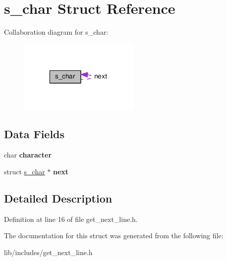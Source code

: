 \hypertarget{structs__char}{\section{s\-\_\-char Struct Reference}
\label{structs__char}
}


Collaboration diagram for s\-\_\-char\-:
\nopagebreak
\begin{figure}[H]
\begin{center}
\leavevmode
\includegraphics[width=166pt]{structs__char__coll__graph}
\end{center}
\end{figure}
\subsection*{Data Fields}
\begin{DoxyCompactItemize}
\item 
\hypertarget{structs__char_ac6027d2dbb9ac08b3b6729341c0bcf8f}{char {\bfseries character}}\label{structs__char_ac6027d2dbb9ac08b3b6729341c0bcf8f}

\item 
\hypertarget{structs__char_a948ac1df44de106ac471ed05df56482c}{struct \hyperlink{structs__char}{s\-\_\-char} $\ast$ {\bfseries next}}\label{structs__char_a948ac1df44de106ac471ed05df56482c}

\end{DoxyCompactItemize}


\subsection{Detailed Description}


Definition at line 16 of file get\-\_\-next\-\_\-line.\-h.



The documentation for this struct was generated from the following file\-:\begin{DoxyCompactItemize}
\item 
lib/includes/get\-\_\-next\-\_\-line.\-h\end{DoxyCompactItemize}
